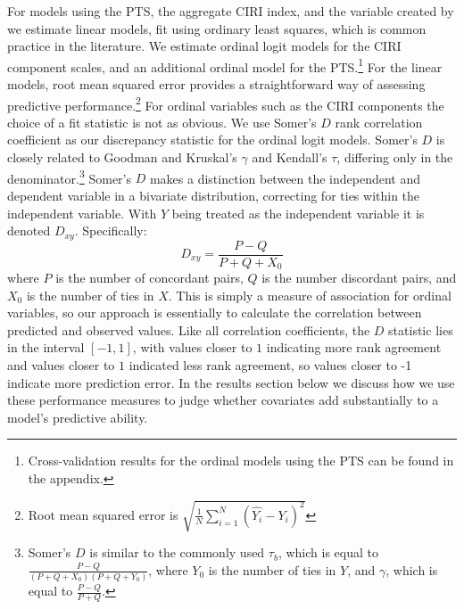 \documentclass[12pt]{article}
\begin{document}
For models using the PTS, the aggregate CIRI index, and the variable created by \citet{Fariss2013} we estimate linear models, fit using ordinary least squares, which is common practice in the literature. We estimate ordinal logit models for the CIRI component scales, and an additional ordinal model for the PTS.\footnote{Cross-validation results for the ordinal models using the PTS can be found in the appendix.} For the linear models, root mean squared error provides a straightforward way of assessing predictive performance.\footnote{Root mean squared error is $\displaystyle \sqrt{\frac{1}{N} \sum\limits_{i=1}^N (\hat{Y_{i}} - Y_{i})^2} $} For ordinal variables such as the CIRI components the choice of a fit statistic is not as obvious. We use Somer's $D$ rank correlation coefficient  \citep{Somers1962} as our discrepancy statistic for the ordinal logit models.
Somer's $D$ is closely related to Goodman and Kruskal's $\gamma$ and Kendall's $\tau$, differing only in the denominator.\footnote{Somer's $D$ is similar to the commonly used $\tau_b$, which is equal to $\frac{P - Q}{(P+Q+X_0)(P+Q+Y_0)}$, where $Y_0$ is the number of ties in $Y$, and $\gamma$, which is equal to $\frac{P - Q}{P + Q}$.} Somer's $D$ makes a distinction between the independent and dependent variable in a bivariate distribution, correcting for ties within the independent variable. With $Y$ being treated as the independent variable it is denoted $D_{xy}$. 
Specifically:
$$D_{xy} = \frac{P - Q}{P + Q + X_0}$$
\noindent where $P$ is the number of concordant pairs, $Q$ is the number discordant pairs, and $X_0$ is the number of ties in $X$. This is simply a measure of association for ordinal variables, so our approach is essentially to calculate the correlation between predicted and observed values. Like all correlation coefficients, the $D$ statistic lies in the interval $[-1, 1]$, with values closer to $1$ indicating more rank agreement and values closer to $1$ indicated less rank agreement, so values closer to -1 indicate more prediction error. In the results section below we discuss how we use these performance measures to judge whether covariates add substantially to a model's predictive ability.
\end{document}
